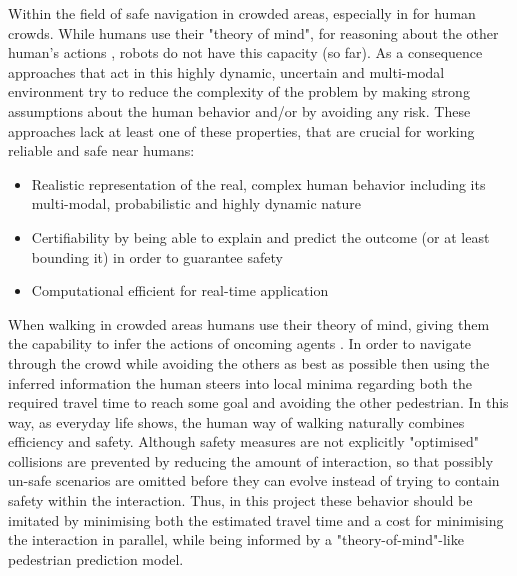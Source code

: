 Within the field of safe navigation in crowded areas, especially in for human crowds. While humans use their "theory of mind", for reasoning about the other human's actions \cite{Gweon2013}, robots do not have this capacity (so far). As a consequence approaches that act in this highly dynamic, uncertain and multi-modal environment try to reduce the complexity of the problem by making strong assumptions about the human behavior and/or by avoiding any risk. These approaches lack at least one of these properties, that are crucial for working reliable and safe near humans: 

\begin{itemize}
\item Realistic representation of the real, complex human behavior including its multi-modal, probabilistic and highly dynamic nature
\item Certifiability by being able to explain and predict the outcome (or at least bounding it) in order to guarantee safety 
\item Computational efficient for real-time application
\end{itemize}

When walking in crowded areas humans use their theory of mind, giving them the capability to infer the actions of oncoming agents \cite{Ivanovic2018} \cite{Gweon2013}. In order to navigate through the crowd while avoiding the others as best as possible then using the inferred information the human steers into local minima regarding both the required travel time to reach some goal and avoiding the other pedestrian. In this way, as everyday life shows, the human way of walking naturally combines efficiency and safety. Although safety measures are not explicitly "optimised" collisions are prevented by reducing the amount of interaction, so that possibly un-safe scenarios are omitted before they can evolve instead of trying to contain safety within the interaction. Thus, in this project these behavior should be imitated by minimising both the estimated travel time and a cost for minimising the interaction in parallel, while being informed by a "theory-of-mind"-like pedestrian prediction model. 



